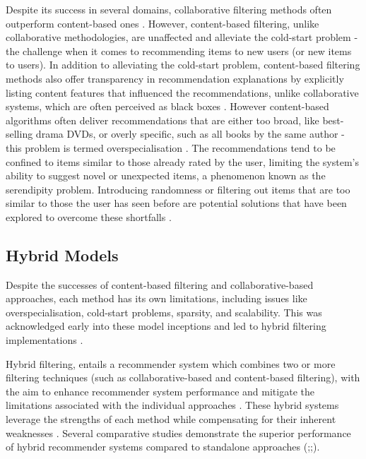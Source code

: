 Despite its success in several domains, collaborative filtering methods often outperform content-based ones \cite{thorat2015survey}. However, content-based filtering, unlike collaborative methodologies, are unaffected and alleviate the cold-start problem \cite{chen2017fully} - the challenge when it comes to recommending items to new users (or new items to users). In addition to alleviating the cold-start problem, content-based filtering methods also offer transparency in recommendation explanations by explicitly listing content features that influenced the recommendations, unlike collaborative systems, which are often perceived as black boxes \cite{lops2011content}. However content-based algorithms often deliver recommendations that are either too broad, like best-selling drama DVDs, or overly specific, such as all books by the same author - this problem is termed overspecialisation \cite{linden2003amazon}. The recommendations tend to be confined to items similar to those already rated by the user, limiting the system's ability to suggest novel or unexpected items, a phenomenon known as the serendipity problem. Introducing randomness or filtering out items that are too similar to those the user has seen before are potential solutions that have been explored to overcome these shortfalls \cite{lops2011content}. 

\subsection{Hybrid Models}
\label{subsec:2 Hybrid Models}

Despite the successes of content-based filtering and collaborative-based approaches, each method has its own limitations, including issues like overspecialisation, cold-start problems, sparsity, and scalability. This was acknowledged early into these model inceptions and led to hybrid filtering implementations \cite{vassiliou2006hybrid}.

Hybrid filtering, entails a recommender system which combines two or more filtering techniques (such as collaborative-based and content-based filtering), with the aim to enhance recommender system performance and mitigate the limitations associated with the individual approaches \cite{seth2022comparative}. These hybrid systems leverage the strengths of each method while compensating for their inherent weaknesses \cite{zhou2010solving}. Several comparative studies demonstrate the superior performance of hybrid recommender systems compared to standalone approaches (\cite{burke2007hybrid};\cite{vassiliou2006hybrid};\cite{ccano2017hybrid}). 

